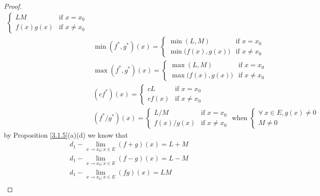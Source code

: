 \begin{proof}
\begin{align*}
\begin{cases}
            LM        & \text{if } x = x_0    \\
            f(x) g(x) & \text{if } x \neq x_0
        \end{cases}                                            \\
                                       & \min(f^*, g^*)(x) = \begin{cases}
            \min(L, M)               & \text{if } x = x_0    \\
            \min\big(f(x), g(x)\big) & \text{if } x \neq x_0
        \end{cases}                                       \\
                                       & \max(f^*, g^*)(x) = \begin{cases}
            \max(L, M)               & \text{if } x = x_0    \\
            \max\big(f(x), g(x)\big) & \text{if } x \neq x_0
        \end{cases}                                       \\
                                       & (c f^*)(x) = \begin{cases}
            cL     & \text{if } x = x_0    \\
            c f(x) & \text{if } x \neq x_0
        \end{cases}                                              \\
                                       & (f^* / g^*)(x) = \begin{cases}
            L / M       & \text{if } x = x_0    \\
            f(x) / g(x) & \text{if } x \neq x_0
        \end{cases} \text{ when } \begin{cases}
            \forall\ x \in E, g(x) \neq 0 \\
            M \neq 0
        \end{cases}
    \end{align*}
    by Proposition \ref{3.1.5}(a)(d) we know that
    \begin{align*}
         & d_1 - \lim_{x \to x_0 ; x \in E} (f + g)(x) = L + M                                        \\
         & d_1 - \lim_{x \to x_0 ; x \in E} (f - g)(x) = L - M                                        \\
         & d_1 - \lim_{x \to x_0 ; x \in E} (fg)(x) = LM                                              \\

\end{align*}
\end{proof}
